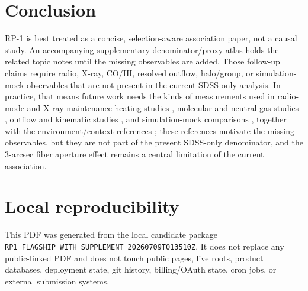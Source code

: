 \documentclass[twocolumn]{aastex631}
\begin{document}
\section{Conclusion}
RP-1 is best treated as a concise, selection-aware association paper, not a causal study. An accompanying supplementary denominator/proxy atlas holds the related topic notes until the missing observables are added. Those follow-up claims require radio, X-ray, CO/HI, resolved outflow, halo/group, or simulation-mock observables that are not present in the current SDSS-only analysis.
In practice, that means future work needs the kinds of measurements used in radio-mode and X-ray maintenance-heating studies \citep{best2005,fabian2012,mcnamara2007,heckmanbest2014,lamassa2013}, molecular and neutral gas studies \citep{xcoldgass2017,xgass2018}, outflow and kinematic studies \citep{veilleux2005,cicone2014,carniani2017,fiore2017}, and simulation-mock comparisons \citep{simba2019,tng2019,eagle2015}, together with the environment/context references \citep{peng2010,piotrowska2022,wetzel2013,dekel2006}; these references motivate the missing observables, but they are not part of the present SDSS-only denominator, and the 3-arcsec fiber aperture effect remains a central limitation of the current association.

\section{Local reproducibility}
This PDF was generated from the local candidate package \texttt{RP1\_FLAGSHIP\_WITH\_SUPPLEMENT\_20260709T013510Z}. It does not replace any public-linked PDF and does not touch public pages, live roots, product databases, deployment state, git history, billing/OAuth state, cron jobs, or external submission systems.
\end{document}
